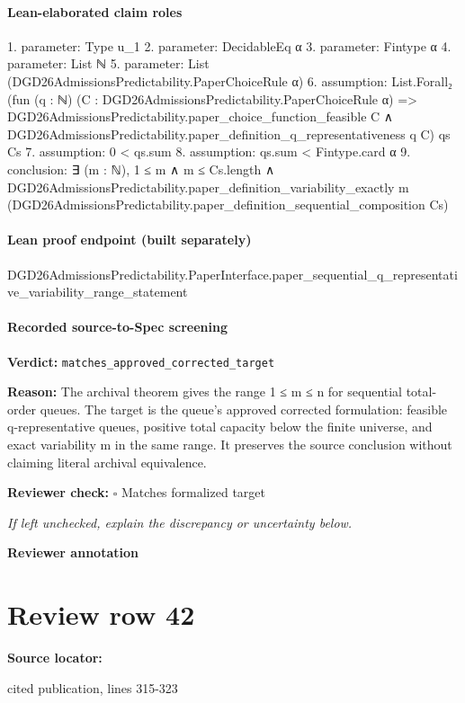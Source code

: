 \documentclass[10pt]{article}
\newcommand{\reviewerbox}{%
  \par\noindent\fbox{\parbox{0.96\linewidth}{\rule{0pt}{0.38in}}}\par
}
\newcommand{\reviewmatch}[1]{%
  \par\noindent\textbf{Reviewer check:} $\square$\; #1\par
  \noindent\emph{If left unchecked, explain the discrepancy or uncertainty below.}\par
}
\begin{document}
\paragraph{Lean-elaborated claim roles}\begin{ReviewVerbatim}
1. parameter: Type u_1
2. parameter: DecidableEq α
3. parameter: Fintype α
4. parameter: List ℕ
5. parameter: List (DGD26AdmissionsPredictability.PaperChoiceRule α)
6. assumption: List.Forall₂
  (fun (q : ℕ) (C : DGD26AdmissionsPredictability.PaperChoiceRule α) =>
    DGD26AdmissionsPredictability.paper_choice_function_feasible C ∧
      DGD26AdmissionsPredictability.paper_definition_q_representativeness q C)
  qs Cs
7. assumption: 0 < qs.sum
8. assumption: qs.sum < Fintype.card α
9. conclusion: ∃ (m : ℕ),
  1 ≤ m ∧
    m ≤ Cs.length ∧
      DGD26AdmissionsPredictability.paper_definition_variability_exactly m
        (DGD26AdmissionsPredictability.paper_definition_sequential_composition Cs)
\end{ReviewVerbatim}

\paragraph{Lean proof endpoint (built separately)}\begin{ReviewVerbatim}
DGD26AdmissionsPredictability.PaperInterface.paper_sequential_q_representative_variability_range_statement
\end{ReviewVerbatim}

\paragraph{Recorded source-to-Spec screening}
\textbf{Verdict:} \texttt{matches\_approved\_corrected\_target}
\\
{\raggedright
\textbf{Reason:} The archival theorem gives the range 1 ≤ m ≤ n for sequential total-\allowbreak{}order queues.\allowbreak{} The target is the queue's approved corrected formulation:\allowbreak{} feasible q-\allowbreak{}representative queues, positive total capacity below the finite universe, and exact variability m in the same range.\allowbreak{} It preserves the source conclusion without claiming literal archival equivalence.\allowbreak{}
\par}
\reviewmatch{Matches formalized target}
\noindent\textbf{Reviewer annotation}\par
\reviewerbox
\clearpage
\hypertarget{source-claim-26bfa3509b616c5d}{}
\section*{Review row 42}
\textbf{Source locator:} {\footnotesize\raggedright cited publication, lines 315-\allowbreak{}323\par}
\end{document}
